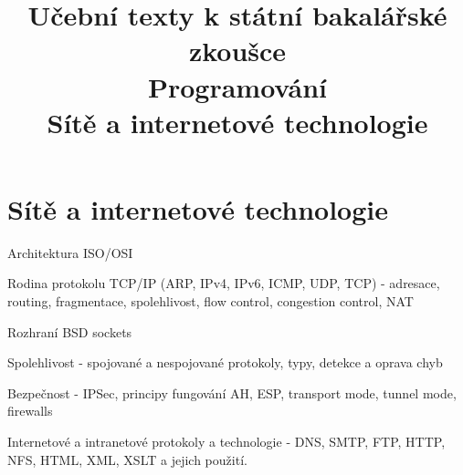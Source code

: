 \clearpage  \clearpage
\title{\LARGE Učební texty k státní bakalářské zkoušce \\ Programování \\ Sítě a internetové technologie}

\maketitle
\newpage
\setcounter{section}{5}
\section{Sítě a internetové technologie}
\begin{pozadavky}
\begin{pitemize}
\item Architektura ISO/OSI
\item Rodina protokolu TCP/IP (ARP, IPv4, IPv6, ICMP, UDP, TCP) - adresace, routing, fragmentace, spolehlivost, flow control, congestion control, NAT
\item Rozhraní BSD sockets
\item Spolehlivost - spojované a nespojované protokoly, typy, detekce a oprava chyb
\item Bezpečnost - IPSec, principy fungování AH, ESP, transport mode, tunnel mode, firewalls
\item Internetové a intranetové protokoly a technologie - DNS, SMTP, FTP, HTTP, NFS, HTML, XML, XSLT a jejich použití.
\end{pitemize}
\end{pozadavky}








